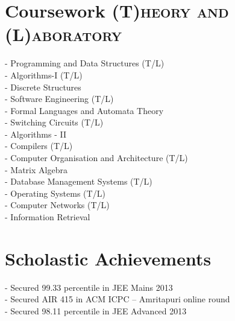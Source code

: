 \documentclass[a4paper,10pt]{extarticle} %
\begin{document}
\section{Coursework
\hfill\small\textsc{(T)heory and (L)aboratory}}

\begin{multicols}{2}
- Programming and Data Structures (T/L) \\
- Algorithms-I (T/L) \\
- Discrete Structures \\
- Software Engineering (T/L) \\
- Formal Languages and Automata Theory \\
- Switching Circuits (T/L) \\
- Algorithms - II \\
- Compilers (T/L) \\
- Computer Organisation and Architecture (T/L) \\
- Matrix Algebra \\
- Database Management Systems (T/L) \\
- Operating Systems (T/L) \\
- Computer Networks (T/L) \\
- Information Retrieval
\end{multicols}


\section{Scholastic Achievements}

\begin{multicols}{2}
- Secured 99.33 percentile in JEE Mains 2013 \\
- Secured AIR 415 in ACM ICPC – Amritapuri online round \\
- Secured 98.11 percentile in JEE Advanced 2013
\end{multicols}


\end{document}
